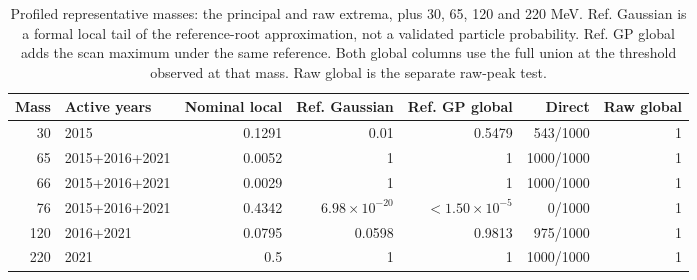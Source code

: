 \begin{table}[H]\centering\small
\begin{tabular}{rlrrrrr}\toprule
Mass & Active years & Nominal local & Ref. Gaussian & Ref. GP global & Direct & Raw global\\\midrule
30 & 2015 & 0.1291 & 0.01 & 0.5479 & 543/1000 & 1 \\
65 & 2015+2016+2021 & 0.0052 & 1 & 1 & 1000/1000 & 1 \\
66 & 2015+2016+2021 & 0.0029 & 1 & 1 & 1000/1000 & 1 \\
76 & 2015+2016+2021 & 0.4342 & $6.98\times10^{-20}$ & $<$$1.50\times10^{-5}$ & 0/1000 & 1 \\
120 & 2016+2021 & 0.0795 & 0.0598 & 0.9813 & 975/1000 & 1 \\
220 & 2021 & 0.5 & 1 & 1 & 1000/1000 & 1 \\
\bottomrule\end{tabular}
\caption{Profiled representative masses: the principal and raw extrema, plus 30, 65, 120 and 220 MeV. Ref. Gaussian is a formal local tail of the reference-root approximation, not a validated particle probability. Ref. GP global adds the scan maximum under the same reference. Both global columns use the full union at the threshold observed at that mass. Raw global is the separate raw-peak test.}\end{table}

